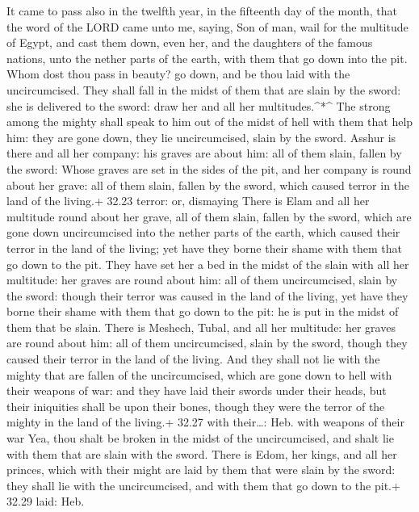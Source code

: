  It came to pass also in the twelfth year, in the fifteenth
day of the month, that the word of the LORD came unto me, saying,
 Son of man, wail for the multitude of Egypt, and cast them
down, even her, and the daughters of the famous nations, unto the nether
parts of the earth, with them that go down into the pit. 
Whom dost thou pass in beauty? go down, and be thou laid with the
uncircumcised.  They shall fall in the midst of them that
are slain by the sword: she is delivered to the sword: draw her and all
her multitudes.\^{}*\^{}  The strong among the mighty shall
speak to him out of the midst of hell with them that help him: they are
gone down, they lie uncircumcised, slain by the sword. 
Asshur is there and all her company: his graves are about him: all of
them slain, fallen by the sword:  Whose graves are set in
the sides of the pit, and her company is round about her grave: all of
them slain, fallen by the sword, which caused terror in the land of the
living.+ 32.23 terror: or, dismaying  There is Elam and all
her multitude round about her grave, all of them slain, fallen by the
sword, which are gone down uncircumcised into the nether parts of the
earth, which caused their terror in the land of the living; yet have
they borne their shame with them that go down to the pit. 
They have set her a bed in the midst of the slain with all her
multitude: her graves are round about him: all of them uncircumcised,
slain by the sword: though their terror was caused in the land of the
living, yet have they borne their shame with them that go down to the
pit: he is put in the midst of them that be slain.  There
is Meshech, Tubal, and all her multitude: her graves are round about
him: all of them uncircumcised, slain by the sword, though they caused
their terror in the land of the living.  And they shall not
lie with the mighty that are fallen of the uncircumcised, which are gone
down to hell with their weapons of war: and they have laid their swords
under their heads, but their iniquities shall be upon their bones,
though they were the terror of the mighty in the land of the living.+
32.27 with their\ldots: Heb. with weapons of their war 
Yea, thou shalt be broken in the midst of the uncircumcised, and shalt
lie with them that are slain with the sword.  There is
Edom, her kings, and all her princes, which with their might are laid by
them that were slain by the sword: they shall lie with the
uncircumcised, and with them that go down to the pit.+ 32.29 laid: Heb.
